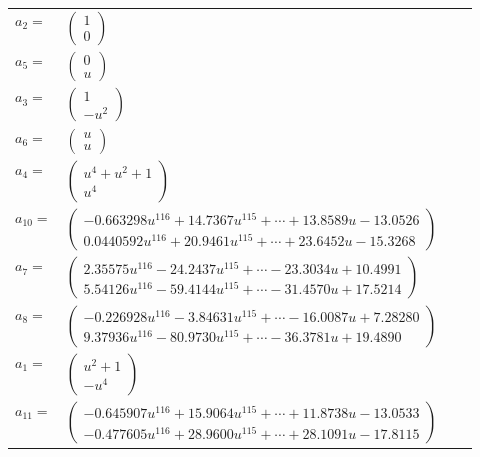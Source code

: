 \documentclass[1p]{elsarticle_modified}
\theoremstyle{definition}
\begin{document}
\begin{tabular}{m{7pt} m{180pt} m{7pt} m{180pt} }
\flushright $a_{2}=$&$\begin{pmatrix}1\\0\end{pmatrix}$ \\
\flushright $a_{5}=$&$\begin{pmatrix}0\\u\end{pmatrix}$ \\
\flushright $a_{3}=$&$\begin{pmatrix}1\\- u^2\end{pmatrix}$ \\
\flushright $a_{6}=$&$\begin{pmatrix}u\\u\end{pmatrix}$ \\
\flushright $a_{4}=$&$\begin{pmatrix}u^4+u^2+1\\u^4\end{pmatrix}$ \\
\flushright $a_{10}=$&$\begin{pmatrix}-0.663298 u^{116}+14.7367 u^{115}+\cdots+13.8589 u-13.0526\\0.0440592 u^{116}+20.9461 u^{115}+\cdots+23.6452 u-15.3268\end{pmatrix}$ \\
\flushright $a_{7}=$&$\begin{pmatrix}2.35575 u^{116}-24.2437 u^{115}+\cdots-23.3034 u+10.4991\\5.54126 u^{116}-59.4144 u^{115}+\cdots-31.4570 u+17.5214\end{pmatrix}$ \\
\flushright $a_{8}=$&$\begin{pmatrix}-0.226928 u^{116}-3.84631 u^{115}+\cdots-16.0087 u+7.28280\\9.37936 u^{116}-80.9730 u^{115}+\cdots-36.3781 u+19.4890\end{pmatrix}$ \\
\flushright $a_{1}=$&$\begin{pmatrix}u^2+1\\- u^4\end{pmatrix}$ \\
\flushright $a_{11}=$&$\begin{pmatrix}-0.645907 u^{116}+15.9064 u^{115}+\cdots+11.8738 u-13.0533\\-0.477605 u^{116}+28.9600 u^{115}+\cdots+28.1091 u-17.8115\end{pmatrix}$ \\

\end{tabular}
\end{document}

